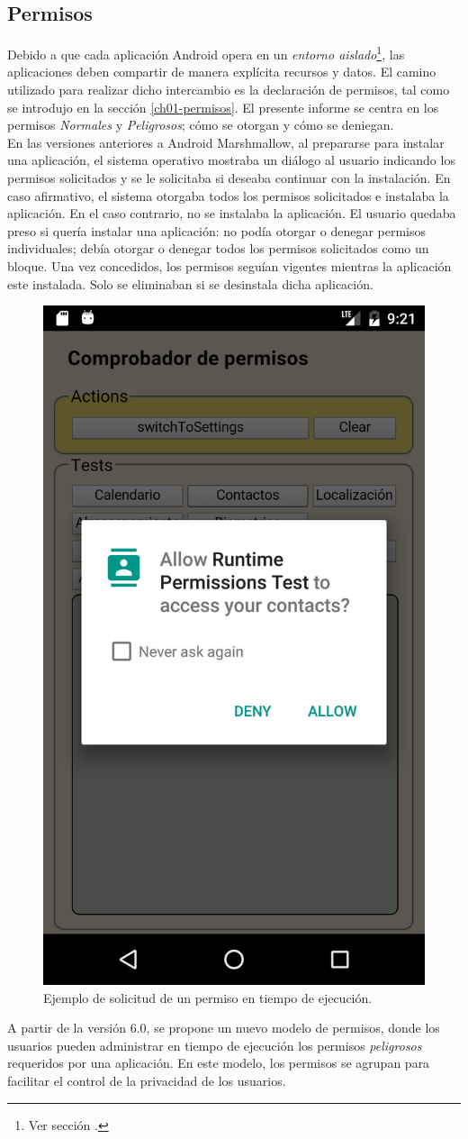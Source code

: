 \subsection{Permisos}
Debido a que cada aplicación Android opera en un \emph{entorno aislado}\footnote{Ver sección .}, las aplicaciones deben compartir de manera explícita recursos y datos. El camino utilizado para realizar dicho intercambio es la declaración de permisos, tal como se introdujo en la sección \ref{ch01-permisos}. El presente informe se centra en los permisos \emph{Normales} y \emph{Peligrosos}; cómo se otorgan y cómo se deniegan.\\
En las versiones anteriores a Android Marshmallow, al prepararse para instalar una aplicación, el sistema operativo mostraba un diálogo al usuario indicando los permisos solicitados y se le solicitaba si deseaba continuar con la instalación. En caso afirmativo, el sistema otorgaba todos los permisos solicitados e instalaba la aplicación. En el caso contrario, no se instalaba la aplicación. El usuario quedaba preso si quería instalar una aplicación: no podía otorgar o denegar permisos individuales; debía otorgar o denegar todos los permisos solicitados como un bloque. Una vez concedidos, los permisos seguían vigentes mientras la aplicación este instalada. Solo se eliminaban si se desinstala dicha aplicación.\\
\begin{figure}[htbp]
    \centering
    \includegraphics[width=0.35\linewidth]{imgs/chapter5/allow_contact}
    \caption{Ejemplo de solicitud de un permiso en tiempo de ejecución.}
    \label{fig:ch01:permission-request}
\end{figure}
A partir de la versión 6.0, se propone un nuevo modelo de permisos, donde los usuarios pueden administrar en tiempo de ejecución los permisos \emph{peligrosos} requeridos por una aplicación. En este modelo, los permisos se agrupan para facilitar el control de la privacidad de los usuarios.\\
